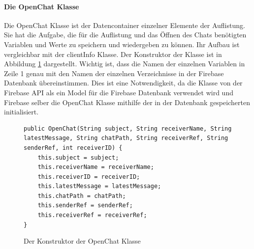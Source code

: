 \documentclass[a4paper,11pt]{report}
\begin{document}
			\paragraph{Die OpenChat Klasse}
			Die OpenChat Klasse ist der Datencontainer einzelner Elemente der Auflistung. Sie hat die Aufgabe, die für die Auflistung und das Öffnen des Chats benötigten Variablen und Werte zu speichern und wiedergeben zu können. Ihr Aufbau ist vergleichbar mit der clientInfo Klasse.  Der Konstruktor der Klasse ist in Abbildung \ref{java:OpenChat} dargestellt. Wichtig ist, dass die Namen der einzelnen Variablen in Zeile 1 genau mit den Namen der einzelnen Verzeichnisse in der Firebase Datenbank übereinstimmen. Dies ist eine Notwendigkeit, da die Klasse von der Firebase API als ein Model für die Firebase Datenbank verwendet wird und Firebase selber die OpenChat Klasse mithilfe der in der Datenbank gespeicherten initialisiert.
			
\begin{figure}
	\begin{center}
		\begin{verbatim}
public OpenChat(String subject, String receiverName, String latestMessage, String chatPath, String receiverRef, String senderRef, int receiverID) {
	this.subject = subject;
	this.receiverName = receiverName;
	this.receiverID = receiverID;
	this.latestMessage = latestMessage;
	this.chatPath = chatPath;
	this.senderRef = senderRef;
	this.receiverRef = receiverRef;
}					
		\end{verbatim}
	\caption{Der Konstruktor der OpenChat Klasse}\label{java:OpenChat}
	\end{center}

\end{figure}	
\end{document}
